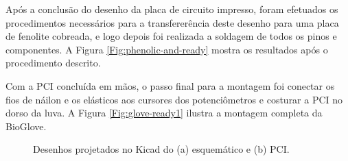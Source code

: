 \documentclass[
	12pt,				%
	openright,			%
	oneside,			%
	a4paper,			%
	english,			%
	brazil				%
	]{abntex2}
\begin{document}
			Após a conclusão do desenho da placa de circuito impresso, foram efetuados os procedimentos necessários para a transfererência deste desenho para uma placa de fenolite cobreada, e logo depois foi realizada a soldagem de todos os pinos e componentes. A Figura \ref{Fig:phenolic-and-ready} mostra os resultados após o procedimento descrito. 
		
		Com a PCI concluída em mãos, o passo final para a montagem foi conectar os fios de náilon e os elásticos aos cursores dos potenciômetros e costurar a PCI no dorso da luva. A Figura \ref{Fig:glove-ready1} ilustra a montagem completa da BioGlove.

	\begin{figure}[!htb]
		 \centering
		 \caption{ Desenhos projetados no Kicad do (a) esquemático e (b) PCI. }
		 \centering
		 \label{Fig:schematic-and-PCB}
	\end{figure}
\end{document}
